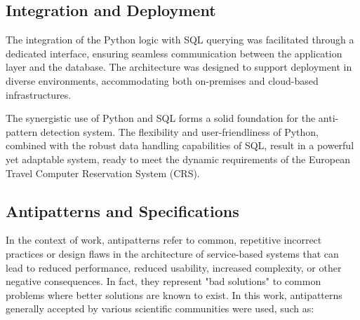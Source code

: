\documentclass[12pt, times]{article}
\begin{document}
		\subsection*{Integration and Deployment}
		
		\hspace*{5mm}The integration of the Python logic with SQL querying was facilitated through a dedicated interface, ensuring seamless communication between the application layer and the database. The architecture was designed to support deployment in diverse environments, accommodating both on-premises and cloud-based infrastructures.
		
		\hspace*{5mm}The synergistic use of Python and SQL forms a solid foundation for the anti-pattern detection system. The flexibility and user-friendliness of Python, combined with the robust data handling capabilities of SQL, result in a powerful yet adaptable system, ready to meet the dynamic requirements of the European Travel Computer Reservation System (CRS).


	\subsection{Antipatterns and Specifications}
	\label{sec:specifications}
	
	\hspace*{5mm} In the context of work, antipatterns refer to common, repetitive incorrect practices or design flaws in the architecture of service-based systems that can lead to reduced performance, reduced usability, increased complexity, or other negative consequences. In fact, they represent "bad solutions" to common problems where better solutions are known to exist. In this work, antipatterns generally accepted by various scientific communities \cite{doc} were used, such as:
	
\end{document}
